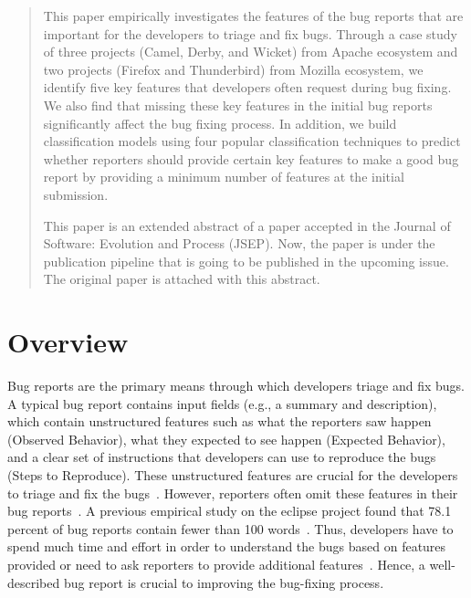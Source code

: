 \documentclass[conference]{IEEEtran}
\begin{document}
\begin{abstract}
This paper empirically investigates the features of the bug reports that are important for the developers to triage and fix bugs. Through a case study of three projects (Camel, Derby, and Wicket) from Apache ecosystem and two projects (Firefox and Thunderbird) from Mozilla ecosystem, we identify five key features that developers often request during bug fixing. We also find that missing these key features in the initial bug reports significantly affect the bug fixing process. In addition, we build classification models using four popular classification techniques to predict whether reporters should provide certain key features to make a good bug report by providing a minimum number of features at the initial submission.

This paper is an extended abstract of a paper accepted in the Journal of Software: Evolution and Process (JSEP). Now, the paper is under the publication pipeline that is going to be published in the upcoming issue. The original paper is attached with this abstract.
\end{abstract}


\section{Overview}
Bug reports are the primary means through which developers triage and fix bugs. A typical bug report contains input fields (e.g., a summary and description), which contain unstructured features such as what the reporters saw happen (Observed Behavior), what they expected to see happen (Expected Behavior), and a clear set of instructions that developers can use to reproduce the bugs (Steps to Reproduce). These unstructured features are crucial for the developers to triage and fix the bugs~\cite{Bettenburg:2008}. However, reporters often omit these features in their bug reports~\cite{Breu:2010, Davies:2014, Aranda:2009, Sasso:2016}. A previous empirical study on the eclipse project found that 78.1 percent of bug reports contain fewer than 100 words~\cite{Zhang:2017}. Thus, developers have to spend much time and effort in order to understand the bugs based on features provided or need to ask reporters to provide additional features~\cite{Breu:2010, Karim:2017, ErfaniJoorabchi:2014}. Hence, a well-described bug report is crucial to improving the bug-fixing process.
\end{document}
